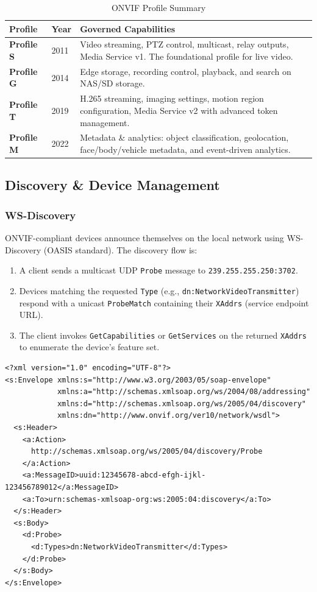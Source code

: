 \documentclass[12pt,a4paper]{article}
\begin{document}
\begin{table}[h!]
\centering
\caption{ONVIF Profile Summary}
\begin{tabularx}{\textwidth}{l l X}
\toprule
\textbf{Profile} & \textbf{Year} & \textbf{Governed Capabilities} \\
\midrule
\textbf{Profile S} & 2011 & Video streaming, PTZ control, multicast, relay outputs, Media Service v1. The foundational profile for live video. \\
\textbf{Profile G} & 2014 & Edge storage, recording control, playback, and search on NAS/SD storage. \\
\textbf{Profile T} & 2019 & H.265 streaming, imaging settings, motion region configuration, Media Service v2 with advanced token management. \\
\textbf{Profile M} & 2022 & Metadata \& analytics: object classification, geolocation, face/body/vehicle metadata, and event-driven analytics. \\
\bottomrule
\end{tabularx}
\end{table}

\subsection{Discovery \& Device Management}

\subsubsection{WS-Discovery}
ONVIF-compliant devices announce themselves on the local network using WS-Discovery (OASIS standard). The discovery flow is:
\begin{enumerate}
    \item A client sends a multicast UDP \texttt{Probe} message to \texttt{239.255.255.250:3702}.
    \item Devices matching the requested \texttt{Type} (e.g., \texttt{dn:NetworkVideoTransmitter}) respond with a unicast \texttt{ProbeMatch} containing their \texttt{XAddrs} (service endpoint URL).
    \item The client invokes \texttt{GetCapabilities} or \texttt{GetServices} on the returned \texttt{XAddrs} to enumerate the device's feature set.
\end{enumerate}

\begin{lstlisting}[style=xmlstyle, caption=WS-Discovery Probe Message]
<?xml version="1.0" encoding="UTF-8"?>
<s:Envelope xmlns:s="http://www.w3.org/2003/05/soap-envelope"
            xmlns:a="http://schemas.xmlsoap.org/ws/2004/08/addressing"
            xmlns:d="http://schemas.xmlsoap.org/ws/2005/04/discovery"
            xmlns:dn="http://www.onvif.org/ver10/network/wsdl">
  <s:Header>
    <a:Action>
      http://schemas.xmlsoap.org/ws/2005/04/discovery/Probe
    </a:Action>
    <a:MessageID>uuid:12345678-abcd-efgh-ijkl-123456789012</a:MessageID>
    <a:To>urn:schemas-xmlsoap-org:ws:2005:04:discovery</a:To>
  </s:Header>
  <s:Body>
    <d:Probe>
      <d:Types>dn:NetworkVideoTransmitter</d:Types>
    </d:Probe>
  </s:Body>
</s:Envelope>
\end{lstlisting}
\end{document}
